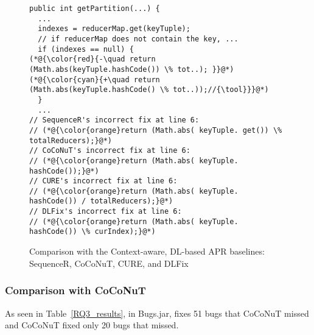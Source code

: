 \begin{figure}[t]
	\centering
	\begin{lstlisting}[]
public int getPartition(...) {
  ...
  indexes = reducerMap.get(keyTuple);
  // if reducerMap does not contain the key, ...
  if (indexes == null) {
(*@{\color{red}{-\quad return (Math.abs(keyTuple.hashCode()) \% tot..);	}}@*)
(*@{\color{cyan}{+\quad return (Math.abs(keyTuple.hashCode() \% tot..));//{\tool}}}@*)
  }
  ...
// SequenceR's incorrect fix at line 6:
// (*@{\color{orange}return (Math.abs( keyTuple. get()) \% totalReducers);}@*)
// CoCoNuT's incorrect fix at line 6:
// (*@{\color{orange}return (Math.abs( keyTuple. hashCode());}@*)
// CURE's incorrect fix at line 6:
// (*@{\color{orange}return (Math.abs( keyTuple. hashCode()) / totalReducers);}@*)
// DLFix's incorrect fix at line 6:
// (*@{\color{orange}return (Math.abs( keyTuple. hashCode()) \% curIndex);}@*)
	\end{lstlisting}
        \vspace{-15pt}
	\caption{Comparison with the Context-aware, DL-based APR baselines: SequenceR, CoCoNuT, CURE, and DLFix}
	\label{example_3}
\end{figure}



\subsubsection{\bf Comparison with CoCoNuT}

As seen in Table~\ref{RQ3_results}, in Bugs\-.jar, {\tool} fixes 51
bugs that CoCoNuT missed and CoCoNuT fixed only 20 bugs that {\tool}
missed.

